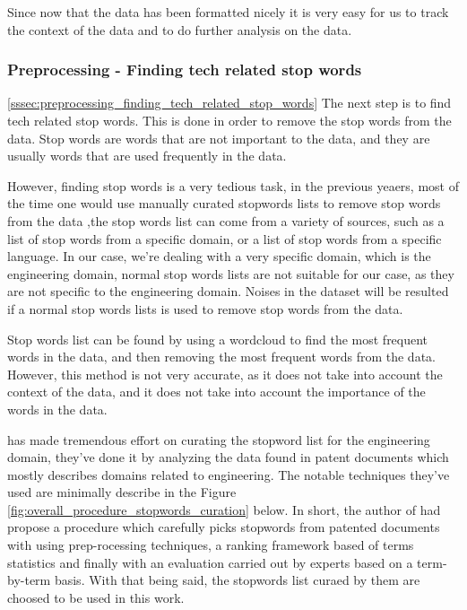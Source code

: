 Since now that the data has been formatted nicely it is very easy for us to track the context of the data and to do further analysis on the data.

\subsubsection{Preprocessing - Finding tech related stop words} \ref{sssec:preprocessing_finding_tech_related_stop_words} \label{sssec:preprocessing_finding_tech_related_stop_words}
The next step is to find tech related stop words. This is done in order to remove the stop words from the data. Stop words are words that are not important to the data, and they are usually words that are used frequently in the data. 

However, finding stop words is a very tedious task, in the previous yeaers, most of the time one would use manually curated stopwords lists to remove stop words from the data \cite{stopwords_1},the stop words list can come from a variety of sources, such as a list of stop words from a specific domain, or a list of stop words from a specific language. In our case, we're dealing with a very specific domain, which is the engineering domain, normal stop words lists are not suitable for our case, as they are not specific to the engineering domain. Noises in the dataset will be resulted if a normal stop words lists is used to remove stop words from the data.

Stop words list can be found by using a wordcloud to find the most frequent words in the data, and then removing the most frequent words from the data. However, this method is not very accurate, as it does not take into account the context of the data, and it does not take into account the importance of the words in the data. 

\cite{stopwords_2} has made tremendous effort on curating the stopword list for the engineering domain, they've done it by analyzing the data found in patent documents which mostly describes domains related to engineering. The notable techniques they've used are minimally describe in the Figure \ref{fig:overall_procedure_stopwords_curation} below. In short, the author of \cite{stopwords_2} had propose a procedure which carefully picks stopwords from patented documents with using prep-rocessing techniques, a ranking framework based of terms statistics and finally with an evaluation carried out by experts based on a term-by-term basis. With that being said, the stopwords list curaed by them are choosed to be used in this work.

